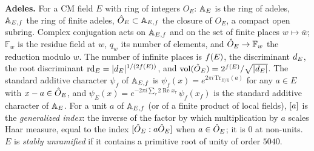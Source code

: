 \documentclass[11pt,a4paper]{article}
\newcommand{\Q}{\mathbb{Q}}
\newcommand{\subhead}[1]{\par\addvspace{9pt plus 2pt}\Needspace{4\baselineskip}\noindent\textbf{#1}\enspace\ignorespaces}
\theoremstyle{plainx}
\theoremstyle{uprightx}
\newcommand{\cj}[1]{\overline{#1}}                  %
\newcommand{\Res}[1]{\mathbb{F}_{#1}}              %
\newcommand{\IntE}{O_E}
\newcommand{\abs}[1]{\lvert #1\rvert}
\begin{document}
\subhead{Adeles.} For a CM field $E$ with ring of integers $\IntE$: $\mathbb{A}_{E}$ is the ring of adeles, $\mathbb{A}_{E,f}$ the ring of
finite adeles, $\hat{O}_E\subset\mathbb{A}_{E,f}$ the closure of $\IntE$, a compact open subring. Complex conjugation acts on $\mathbb{A}_{E,f}$ and
on the set of finite places $w\mapsto\cj{w}$; $\Res{w}$ is the residue field at $w$, $q_w$ its number of elements, and
$\hO\to\Res{w}$ the reduction modulo $w$. The number of infinite places is $f(E)$, the discriminant $d_{E}$, the
root discriminant $\rdE{E}=\abs{\dE{E}}^{1/(2\ninf{E})}$, and $\volO{E}=2^{\ninf{E}}/\sqrt{\abs{\dE{E}}}$. The standard
additive character $\psi_f$ of $\mathbb{A}_{E,f}$ is $\psi_f(x)=e^{2\pi i\,\mathrm{Tr}_{E/\Q}(a)}$ for any $a\in E$ with $x-a\in\hat{O}_E$, and
$\psi_E(x)=e^{-2\pi i\sum_\tau2\operatorname{Re} x_\tau}\,\psi_f(x_f)$ is the standard additive character of $\mathbb{A}_{E}$. For a unit
$a$ of $\mathbb{A}_{E,f}$ (or of a finite product of local fields), $[a]$ is the \emph{generalized index}: the inverse of
the factor by which multiplication by $a$ scales Haar measure, equal to the index $[\hat{O}_E:a\hat{O}_E]$ when $a\in\hat{O}_E$; it is
$0$ at non-units. $E$ is \emph{stably unramified} if it contains a primitive root of unity of order $5040$.
\end{document}
